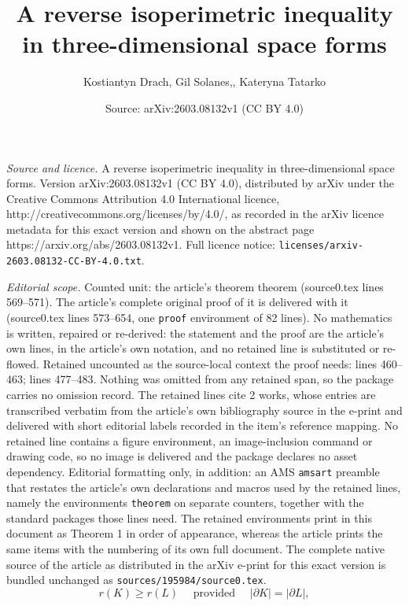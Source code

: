 \documentclass[10pt,a4paper]{amsart}
\title{A reverse isoperimetric inequality in three-dimensional space forms}
\author{Kostiantyn Drach, Gil Solanes,, Kateryna Tatarko}
\date{Source: arXiv:2603.08132v1 (CC BY 4.0)}
\renewcommand{\ge}{\geqslant}
\begin{document}
\maketitle

\noindent\emph{Source and licence.} A reverse isoperimetric inequality in three-dimensional space forms. Version arXiv:2603.08132v1 (CC BY 4.0), distributed by arXiv under the Creative Commons Attribution 4.0 International licence, http://creativecommons.org/licenses/by/4.0/, as recorded in the arXiv licence metadata for this exact version and shown on the abstract page https://arxiv.org/abs/2603.08132v1. Full licence notice: \texttt{licenses/arxiv-2603.08132-CC-BY-4.0.txt}.\par\smallskip

\noindent\textit{Editorial scope.} Counted unit: the article's theorem theorem (source0.tex lines 569--571). The article's complete original proof of it is delivered with it (source0.tex lines 573--654, one \texttt{proof} environment of 82 lines). No mathematics is written, repaired or re-derived: the statement and the proof are the article's own lines, in the article's own notation, and no retained line is substituted or re-flowed.  Retained uncounted as the source-local context the proof needs: lines 460--463; lines 477--483.  Nothing was omitted from any retained span, so the package carries no omission record.  The retained lines cite 2 works, whose entries are transcribed verbatim from the article's own bibliography source in the e-print and delivered with short editorial labels recorded in the item's reference mapping.  No retained line contains a figure environment, an image-inclusion command or drawing code, so no image is delivered and the package declares no asset dependency.  Editorial formatting only, in addition: an AMS \texttt{amsart} preamble that restates the article's own declarations and macros used by the retained lines, namely the environments \texttt{theorem} on separate counters, together with the standard packages those lines need.  The retained environments print in this document as Theorem 1 in order of appearance, whereas the article prints the same items with the numbering of its own full document.  The complete native source of the article as distributed in the arXiv e-print for this exact version is bundled unchanged as \texttt{sources/195984/source0.tex}.
\begin{equation}
    \label{Eq:Inrad}
    r(K) \ge r(L) \quad \text{ provided }\quad |\partial K| = |\partial L|,
\end{equation}
\end{document}
